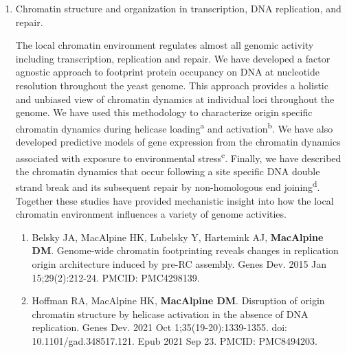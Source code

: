 \documentclass{nihbiosketch}
\begin{document}
\begin{enumerate}
\item Chromatin structure and organization in transcription, DNA replication, and repair.   

The local chromatin environment regulates almost all genomic activity including transcription, replication and repair.  We have developed a factor agnostic approach to footprint  protein occupancy on DNA at nucleotide resolution throughout the yeast genome.  This approach provides a holistic and unbiased view of chromatin dynamics at individual loci throughout the genome.  We have used this methodology to characterize origin specific chromatin dynamics during helicase loading\textsuperscript{a} and activation\textsuperscript{b}. We have also developed predictive models of gene expression from the chromatin dynamics associated with exposure to environmental stress\textsuperscript{c}. Finally, we have described the chromatin dynamics that occur following a site specific DNA double strand break and its subsequent repair by non-homologous end joining\textsuperscript{d}.  Together these studies have provided mechanistic insight into how the local chromatin environment influences a variety of genome activities.  


\begin{enumerate}
\setlength\itemsep{0.35em}


\item Belsky JA, MacAlpine HK, Lubelsky Y, Hartemink AJ, \textbf{MacAlpine DM}. Genome-wide chromatin footprinting reveals changes in replication origin architecture induced by pre-RC assembly. Genes Dev. 2015 Jan 15;29(2):212-24. PMCID: PMC4298139.

\item Hoffman RA, MacAlpine HK, \textbf{MacAlpine DM}. Disruption of origin chromatin structure by helicase activation in the absence of DNA replication. Genes Dev. 2021 Oct 1;35(19-20):1339-1355. doi: 10.1101/gad.348517.121. Epub 2021 Sep 23. PMCID: PMC8494203.


\end{enumerate}
\end{enumerate}
\end{document}
